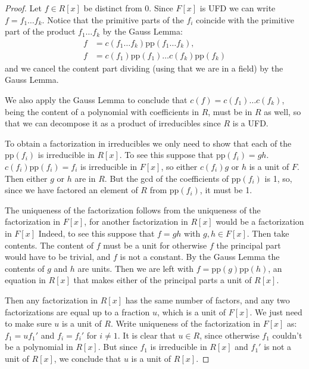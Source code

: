 \begin{proof}
Let $f\in R[x]$ be distinct from 0. Since $F[x]$ is UFD we can write
$f=f_1\ldots f_k$. Notice that the primitive parts of the $f_i$ coincide
with the primitive part of the product $f_1\ldots f_k$ by
the Gauss Lemma: 
\begin{align*}
f&=c(f_1\ldots f_k)\text{pp}(f_1\ldots f_k),\\
f&=c(f_1)\text{pp}(f_1)\ldots c(f_k)\text{pp}(f_k)
\end{align*}
and we cancel the content part dividing (using that we are in a field) by the
Gauss Lemma.

We also apply the Gauss Lemma to conclude that
$c(f)=c(f_1)\ldots c(f_k)$, being the content of a polynomial with coefficients
in $R$, must be in $R$ as well, so that we can decompose it as a product of
irreducibles since $R$ is a UFD.

To obtain a factorization in irreducibles we only need to show that each of the
$\text{pp}(f_i)$ is irreducible in $R[x]$.
To see this suppose that 
$\text{pp}(f_i)=gh$. $c(f_i)\text{pp}(f_i)=f_i$ is irreducible
in $F[x]$, so either $c(f_i)g$ or $h$ is a unit of $F$. Then 
either $g$ or $h$ are in $R$. But the gcd of 
the coefficients of $\text{pp}(f_i)$ is 1, so, since we have factored
an element of $R$ from $\text{pp}(f_i)$, it must be 1.

The uniqueness of the factorization follows from the uniqueness of the
factorization in $F[x]$, for another factorization in $R[x]$ would be a
factorization in $F[x]$
Indeed, to see this suppose that $f=gh$ with $g,h \in F[x]$.
Then take contents. The content of  $f$ must be a unit
for otherwise $f$ the principal part would have to be
trivial, and $f$ is not a constant.
By the Gauss Lemma the contents of $g$ and $h$ are units.
Then we are left with $f=\text{pp}(g)\text{pp}(h)$, an equation
in $R[x]$ that makes either of the principal parts a unit of
$R[x]$.

Then any factorization in $R[x]$ has the
same number of factors,
and any two factorizations are equal up
to a fraction $u$,
which is a unit of $F[x]$. We just need to make sure $u$ is a unit of $R$.
Write uniqueness of the factorization in $F[x]$ as: 
$f_1=uf_1'$ and $f_i=f_i'$ for $i\neq 1$.
It is clear that $u \in R$, since otherwise $f_1$ couldn't
be a polynomial in $R[x]$. But since $f_1$ is irreducible in $R[x]$
and $f_1'$ is not a unit of $R[x]$, 
we conclude that $u$ is a unit of $R[x]$.
\end{proof}

